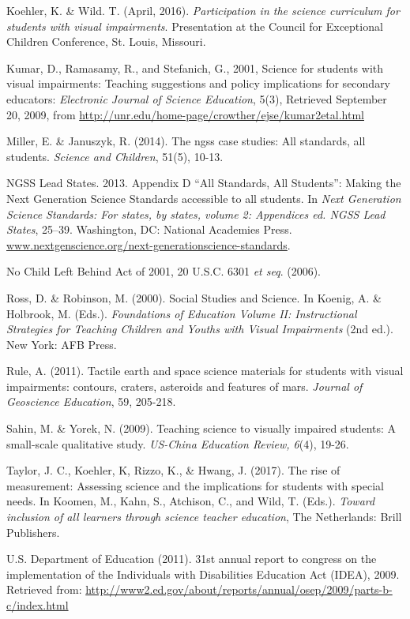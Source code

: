 \documentclass[11.5pt]{sig-alternate} %
\begin{document}
Koehler, K. \& Wild. T.  (April, 2016).  \textit{Participation in the science curriculum for students with visual impairments}.  Presentation at the Council for Exceptional Children Conference, St. Louis, Missouri.

Kumar, D., Ramasamy, R., and Stefanich, G., 2001, Science for students with visual impairments: Teaching suggestions and policy implications for secondary educators: \textit{Electronic Journal of Science Education}, 5(3), Retrieved September 20, 2009, from \url{http://unr.edu/home-page/crowther/ejse/kumar2etal.html}

Miller, E. \& Januszyk, R. (2014).  The ngss case studies: All standards, all students.  \textit{Science and Children}, 51(5), 10-13.

NGSS Lead States. 2013. Appendix D “All Standards, All Students”: Making the Next Generation Science Standards accessible to all students. In \textit{Next Generation Science Standards: For states, by states, volume 2: Appendices ed. NGSS Lead States}, 25–39. Washington, DC: National Academies Press. \url{www.nextgenscience.org/next-generationscience-standards}.

No Child Left Behind Act of 2001, 20 U.S.C. 6301 \textit{et seq}. (2006).

Ross, D. \& Robinson, M.  (2000).  Social Studies and Science.  In Koenig, A. \& Holbrook, M. (Eds.). \textit{ Foundations of Education Volume II: Instructional Strategies for Teaching Children and Youths with Visual Impairments} (2nd ed.).  New York: AFB Press. 

Rule, A. (2011).  Tactile earth and space science materials for students with visual impairments:  contours, craters, asteroids and features of mars.  \textit{Journal of Geoscience Education}, 59, 205-218.  

Sahin, M. \& Yorek, N.  (2009).  Teaching science to visually impaired students: A small-scale qualitative study.  \textit{US-China Education Review, 6}(4), 19-26.

Taylor, J. C., Koehler, K, Rizzo, K., \& Hwang, J.  (2017).  The rise of measurement:  Assessing science and the implications for students with special needs.  In Koomen, M., Kahn, S.,  Atchison, C., and Wild, T. (Eds.). \textit{Toward inclusion of all learners through science teacher education}, The Netherlands:  Brill Publishers.

U.S. Department of Education (2011).  31st annual report to congress on the implementation of the Individuals with Disabilities Education Act (IDEA), 2009. Retrieved from: \url{http://www2.ed.gov/about/reports/annual/osep/2009/parts-b-c/index.html}
\end{document}
